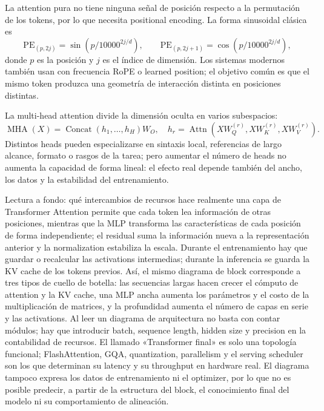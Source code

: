 La attention pura no tiene ninguna señal de posición respecto a la permutación de los tokens, por lo que necesita positional encoding. La forma sinusoidal clásica es
\[
\mathrm{PE}_{(p,2j)}=\sin\!\left(p/10000^{2j/d}\right),\qquad
\mathrm{PE}_{(p,2j+1)}=\cos\!\left(p/10000^{2j/d}\right),
\]
donde $p$ es la posición y $j$ es el índice de dimensión. Los sistemas modernos también usan con frecuencia RoPE o learned position; el objetivo común es que el mismo token produzca una geometría de interacción distinta en posiciones distintas.



La multi-head attention divide la dimensión oculta en varios subespacios:
\[
\operatorname{MHA}(X)=\operatorname{Concat}(h_1,\ldots,h_H)W_O,
\quad h_r=\operatorname{Attn}(XW_Q^{(r)},XW_K^{(r)},XW_V^{(r)}).
\]
Distintos heads pueden especializarse en sintaxis local, referencias de largo alcance, formato o rasgos de la tarea; pero aumentar el número de heads no aumenta la capacidad de forma lineal: el efecto real depende también del ancho, los datos y la estabilidad del entrenamiento.





\begin{knowledgebox}{Lectura a fondo: qué intercambios de recursos hace realmente una capa de Transformer}
Attention permite que cada token lea información de otras posiciones, mientras que la MLP transforma las características de cada posición de forma independiente; el residual suma la información nueva a la representación anterior y la normalization estabiliza la escala. Durante el entrenamiento hay que guardar o recalcular las activations intermedias; durante la inferencia se guarda la KV cache de los tokens previos. Así, el mismo diagrama de block corresponde a tres tipos de cuello de botella: las secuencias largas hacen crecer el cómputo de attention y la KV cache, una MLP ancha aumenta los parámetros y el costo de la multiplicación de matrices, y la profundidad aumenta el número de capas en serie y las activations. Al leer un diagrama de arquitectura no basta con contar módulos; hay que introducir batch, sequence length, hidden size y precision en la contabilidad de recursos. El llamado «Transformer final» es solo una topología funcional; FlashAttention, GQA, quantization, parallelism y el serving scheduler son los que determinan su latency y su throughput en hardware real. El diagrama tampoco expresa los datos de entrenamiento ni el optimizer, por lo que no es posible predecir, a partir de la estructura del block, el conocimiento final del modelo ni su comportamiento de alineación.
\end{knowledgebox}

